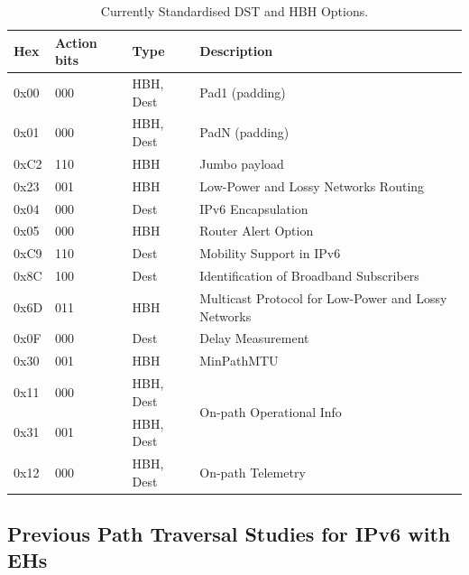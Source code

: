 \documentclass[conference]{IEEEtran}
\begin{document}

\begin{table}[b]
\center
\caption{Currently Standardised DST and HBH Options.}
\begin{tabular}{p{}|p{}|l|p{}}
Hex  & Action bits & Type      & Description                                              \\
\hline
\hline
0x00 & 000  & HBH, Dest & Pad1 (padding)                                           \\
0x01 & 000  & HBH, Dest & PadN (padding)                                           \\
0xC2 & 110  & HBH       & Jumbo payload                                  \\
0x23 & 001  & HBH       & Low-Power and Lossy Networks Routing                     \\
0x04 & 000  & Dest      & IPv6 Encapsulation                 \\
0x05 & 000  & HBH       & Router Alert Option         \\
0xC9 & 110  & Dest      & Mobility Support in IPv6                                 \\
0x8C & 100  & Dest      & Identification of Broadband Subscribers\\
0x6D & 011  & HBH       & Multicast Protocol for Low-Power and  Lossy Networks     \\
0x0F & 000  & Dest      & Delay Measurement                                        \\
0x30 & 001  & HBH       & MinPathMTU                                     \\
0x11 & 000  & HBH, Dest & \multirow{2}{*}{On-path Operational Info}                \\
0x31 & 001  & HBH, Dest &                                                          \\
0x12 & 000  & HBH, Dest & On-path Telemetry                                       
\end{tabular}
  \label{tbl:options}
\end{table}


\subsection{Previous Path Traversal Studies for IPv6 with EHs}
\end{document}

